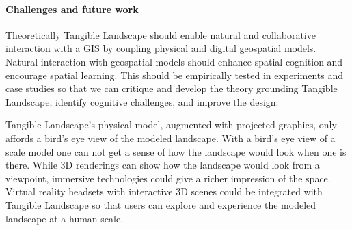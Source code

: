 \documentclass{article}
\begin{document}
\paragraph{Challenges and future work}

Theoretically Tangible Landscape should enable natural and collaborative interaction with a GIS by coupling physical and digital geospatial models.
Natural interaction with geospatial models should enhance spatial cognition and encourage spatial learning. 
This should be empirically tested in experiments and case studies 
so that we can critique and develop the theory grounding Tangible Landscape, 
identify cognitive challenges, and 
improve the design.  








Tangible Landscape's physical model, augmented with projected graphics, only affords a bird's eye view of the modeled landscape. 
With a bird's eye view of a scale model one can not get a sense of how the landscape would look when one is there. 
While 3D renderings can show how the landscape would look from a viewpoint, immersive technologies could give a richer impression of the space. 
Virtual reality headsets with interactive 3D scenes could be integrated with Tangible Landscape so that users can explore and experience the modeled landscape at a human scale. 
\end{document}
